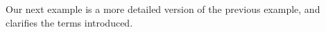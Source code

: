 

Our next example is a more detailed version of the previous example,
and clarifies the terms introduced.

